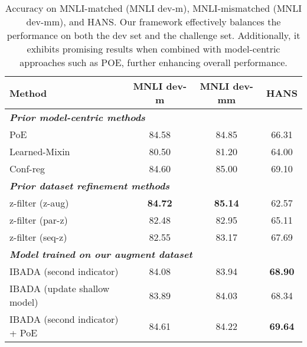 \begin{table*}[!t]
\centering

\begin{tabular}{lccc}
\hline
\textbf{Method}                        & \textbf{MNLI dev-m} & \textbf{MNLI dev-mm} & \textbf{HANS}  \\ \hline
\multicolumn{4}{l}{\textit{\textbf{Prior model-centric methods}}}                  \\ \hline
PoE \cite{karimi-mahabadi-etal-2020-end}                           & 84.58      & 84.85       & 66.31 \\ \hline
Learned-Mixin \cite{clark-etal-2019-dont}                 & 80.50      & 81.20       & 64.00 \\ \hline
Conf-reg \cite{utama-etal-2020-towards}                      & 84.60      & 85.00       & 69.10 \\ \hline
\multicolumn{4}{l}{\textit{\textbf{Prior dataset refinement methods}}}             \\ \hline
z-filter (z-aug) \cite{wu2022generating}              & \textbf{84.72}      & \textbf{85.14}       & 62.57 \\ \hline
z-filter (par-z) \cite{wu2022generating}              & 82.48      & 82.95       & 65.11 \\ \hline
z-filter (seq-z) \cite{wu2022generating}              & 82.55      & 83.17       & 67.69 \\ \hline
\multicolumn{4}{l}{\textit{\textbf{Model trained on our augment dataset}}}          \\ \hline
IBADA (second indicator)       & 84.08      & 83.94       & \textbf{68.90} \\ \hline
IBADA (update shallow model)   & 83.89      & 84.03       & 68.34 \\ \hline
IBADA (second indicator) + PoE & 84.61      & 84.22       & \textbf{69.64} \\ \hline
\end{tabular}%
\caption{Accuracy on MNLI-matched (MNLI dev-m), MNLI-mismatched (MNLI dev-mm), and HANS. Our framework effectively balances the performance on both the dev set and the challenge set. Additionally, it exhibits promising results when combined with model-centric approaches such as POE, further enhancing overall performance.}
\label{tab:mnli results}
\end{table*}